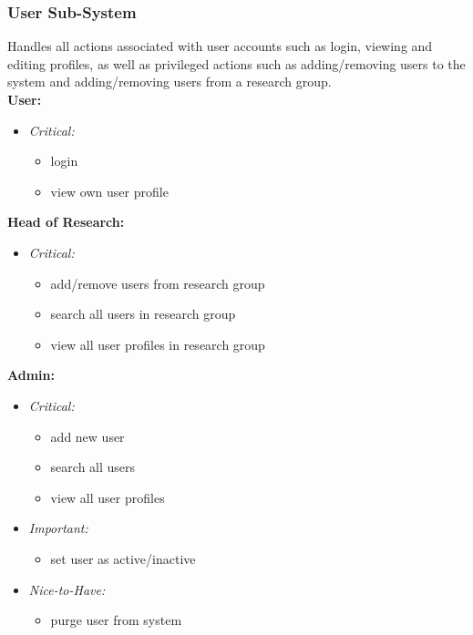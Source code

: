 \documentclass{article}
\begin{document}
			\subsubsection{User Sub-System}\label{subsubsec:priority-user}
				Handles all actions associated with user accounts such as login, viewing and editing profiles, as well as privileged actions such as adding/removing users to the system and adding/removing users from a research group.\\
				[3mm]
				\textbf{User:}
				\begin{itemize}
					\item \textit{Critical:}
					\begin{itemize}
						\item login
						\item view own user profile
					\end{itemize}
				\end{itemize}
				\textbf{Head of Research:}
				\begin{itemize}
					\item \textit{Critical:}
					\begin{itemize}
						\item add/remove users from research group
						\item search all users in research group
						\item view all user profiles in research group
					\end{itemize}
				\end{itemize}
				\textbf{Admin:}
				\begin{itemize}
					\item \textit{Critical:}
					\begin{itemize}
						\item add new user
						\item search all users
						\item view all user profiles
					\end{itemize}
					
					\item \textit{Important:}
					\begin{itemize}
						\item set user as active/inactive
					\end{itemize}
					
					\item \textit{Nice-to-Have:}
					\begin{itemize}
						\item purge user from system
					\end{itemize}
				\end{itemize}
\end{document}
